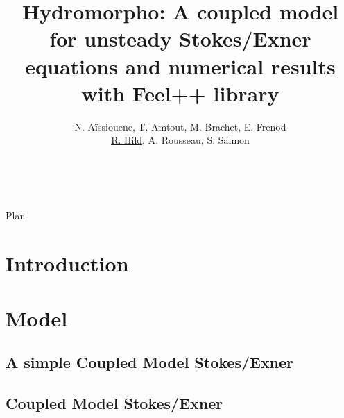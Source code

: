 \documentclass[notes]{beamer}
\title[Hydromorpho project]
{Hydromorpho: A coupled model for unsteady Stokes/Exner equations and numerical results with Feel++ library}
\author[R. Hild]{ N. A\"issiouene, T. Amtout, M. Brachet, E. Frenod \\ \underline{R. Hild}, A. Rousseau, S. Salmon}
\institute[CEMRACS2015]{CEMRACS 2015 - CIRM MARSEILLE}
\date{\mbox{~}}
\begin{document}

\begin{frame}
  \maketitle
  \initclock
\end{frame}
\date{\tdtime}

\begin{frame}{Plan}
  \tableofcontents
\end{frame}


\section{Introduction}


\section{Model}


\subsection{A simple Coupled Model Stokes/Exner}





\subsection{Coupled Model Stokes/Exner}







\end{document}
